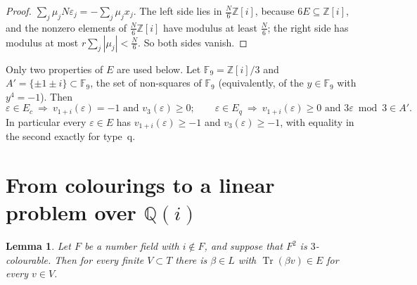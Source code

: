 \documentclass[11pt,a4paper]{amsart}
\newtheorem{lemma}{Lemma}
\theoremstyle{remark}
\newcommand{\Q}{\mathbb{Q}}
\newcommand{\Z}{\mathbb{Z}}
\newcommand{\F}{\mathbb{F}}
\newcommand{\Tr}{\operatorname{Tr}}
\begin{document}
\begin{proof}
$\sum_j\mu_jN\varepsilon_j=-\sum_j\mu_jx_j$. The left side lies in $\frac N6\Z[i]$, because $6E\subseteq\Z[i]$,
and the nonzero elements of $\frac N6\Z[i]$ have modulus at least $\frac N6$; the right side has modulus at most
$r\sum_j|\mu_j|<\frac N6$. So both sides vanish.
\end{proof}

Only two properties of $E$ are used below. Let $\F_9=\Z[i]/3$ and $A'=\{\pm1\pm i\}\subset\F_9$, the set of
non-squares of $\F_9$ (equivalently, of the $y\in\F_9$ with $y^4=-1$). Then
\begin{equation}\label{eq:types}
\varepsilon\in E_c\ \Rightarrow\ v_{1+i}(\varepsilon)=-1\text{ and }v_3(\varepsilon)\ge0;\qquad
\varepsilon\in E_q\ \Rightarrow\ v_{1+i}(\varepsilon)\ge0\text{ and }3\varepsilon\bmod3\in A'.
\end{equation}
In particular every $\varepsilon\in E$ has $v_{1+i}(\varepsilon)\ge-1$ and $v_3(\varepsilon)\ge-1$, with equality
in the second exactly for type~q.

\section{From colourings to a linear problem over \texorpdfstring{$\Q(i)$}{Q(i)}}\label{sec:linear}

\begin{lemma}\label{lem:B1}
Let $F$ be a number field with $i\notin F$, and suppose that $F^2$ is $3$-colourable. Then for every finite
$V\subset T$ there is $\beta\in L$ with $\Tr(\beta v)\in E$ for every $v\in V$.
\end{lemma}
\end{document}

